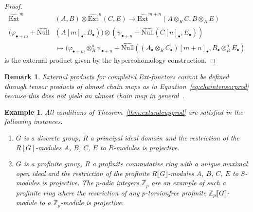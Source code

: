 \documentclass[12pt, a4paper]{article}
\numberwithin{equation}{section}
\newtheorem{rem}[thm]{Remark}
\newtheorem{exl}[thm]{Example}
\theoremstyle{empty}
\theoremstyle{nonumberplain}
\newtheorem{proof}{Proof}
\begin{document}
\begin{proof}
\begin{align*}
\widehat{\mathrm{Ext}}^m &(A, B) \otimes \widehat{\mathrm{Ext}}^n(C, E) \rightarrow \widehat{\mathrm{Ext}}^{m+n}(A \otimes_R C, B \otimes_R E) \\
(\varphi_{\bullet+m}+\widehat{\mathrm{Null}}&(A[m]_{\bullet}, B_{\bullet})) \otimes (\psi_{\bullet+n}+\widehat{\mathrm{Null}}(C[n]_{\bullet}, E_{\bullet})) \\
&\mapsto (\varphi_{\bullet+m} \otimes_R^o \psi_{\bullet+n}+\widehat{\mathrm{Null}}((A_{\bullet} \otimes_R C_{\bullet})[m+n]_{\bullet}, B_{\bullet} \otimes_R^o E_{\bullet})
\end{align*}
is the external product given by the hypercohomology construction.
\end{proof}

\begin{rem}
External products for completed Ext-functors cannot be defined through tensor products of almost chain maps as in Equation~\ref{eq:chaintensorprod} because this does not yield an almost chain map in general~\cite[p.~110]{ben92}.
\end{rem}

\begin{exl}\label{exl:extandcupprods}
All conditions of Theorem~\ref{thm:extandcupprod} are satisfied in the following instances.
\begin{enumerate}
    \item $G$ is a discrete group, $R$ a principal ideal domain and the restriction of the $R[G]$-modules $A$, $B$, $C$, $E$ to $R$-modules is projective.
    \item $G$ is a profinite group, $R$ a profinite commutative ring with a unique maximal open ideal and the restriction of the profinite $R{\llbracket}G{\rrbracket}$-modules $A$, $B$, $C$, $E$ to $S$-modules is projective. The $p$-adic integers $\mathbb{Z}_p$ are an example of such a profinite ring where the restriction of any $p$-torsionfree profinite $\mathbb{Z}_p{\llbracket}G{\rrbracket}$-module to a $\mathbb{Z}_p$-module is projective.
\end{enumerate}
\end{exl}
\end{document}

